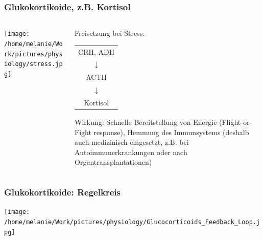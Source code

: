 \documentclass{beamer}
\begin{document}
\begin{frame}
\frametitle{Glukokortikoide, z.B. Kortisol}

\begin{columns}[c]

\begin{column}{5cm}
\begin{center}
\texttt{[image: /home/melanie/Work/pictures/physiology/stress.jpg]}
\end{center}

\end{column}

\begin{column}{5cm}

  
Freisetzung bei Stress: \\[0.2 cm]

\begin{tabular}{c}
CRH, ADH \\
 \(\downarrow\)\\
 ACTH \\
\(\downarrow\) \\
 Kortisol\\[0.5 cm]
\end{tabular}

\pause

Wirkung: Schnelle Bereitstellung von Energie (Flight-or-Fight response), Hemmung des Immunsystems (deshalb auch medizinisch eingesetzt, z.B. bei Autoimmunerkrankungen oder nach Organtransplantationen) \\

\end{column}

  

\end{columns}


\end{frame}



\begin{frame}
\frametitle{Glukokortikoide: Regelkreis}

\begin{center}
\texttt{[image: /home/melanie/Work/pictures/physiology/Glucocorticoids\_Feedback\_Loop.jpg]}
\end{center}


\end{frame}
\end{document}
